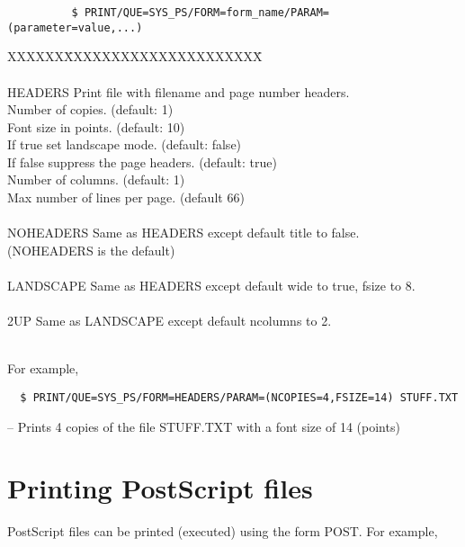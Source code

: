 \begin{verbatim}
          $ PRINT/QUE=SYS_PS/FORM=form_name/PARAM=(parameter=value,...)
\end{verbatim}
\begin{tabbing}
XXXXXX\=XXXXXXXXXXXXXXXXXXXXX\= \kill
{}            \\
\\
\>HEADERS   \>Print file with filename and page number headers.\\
            \>   Number of copies. (default: 1)\\
            \>   Font size in points. (default: 10)\\
            \>   If true set landscape mode. (default: false)\\
            \>   If false suppress the page headers. (default:
true)\\
            \>  Number of columns. (default: 1)\\
            \> Max number of lines per page. (default 66)\\
\\
\>NOHEADERS \>  Same as HEADERS except default title to false.\\
            \>\>(NOHEADERS is the default)\\
\\
\>LANDSCAPE \>  Same as HEADERS except default wide to true, fsize to 8.\\
\\
\>2UP       \>  Same as LANDSCAPE except default ncolumns to 2.\\
\\
\end{tabbing}

For example, 

\begin{verbatim}
  $ PRINT/QUE=SYS_PS/FORM=HEADERS/PARAM=(NCOPIES=4,FSIZE=14) STUFF.TXT
\end{verbatim}
-- Prints 4 copies of the file STUFF.TXT with a font size of 14 (points)

\section{Printing PostScript files}

PostScript files can be printed (executed) using the form POST. For example,

